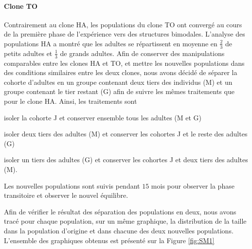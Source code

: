 \paragraph{Clone TO} Contrairement au clone HA, les populations du clone TO ont
convergé au cours de la première phase de l'expérience vers des structures
bimodales. L'analyse des populations HA a montré que les adultes se répartissent
en moyenne en $\frac{2}{3}$ de petits adultes et $\frac{1}{3}$ de grands
adultes. Afin de conserver des manipulations comparables entre les clones HA et
TO, et mettre les nouvelles populations dans des conditions similaires entre les
deux clones, nous avons décidé de séparer la cohorte d'adultes en un groupe
contenant deux tiers des individus (M) et un groupe contenant le tier restant
(G) afin de suivre les mêmes traitements que pour le clone HA.
Ainsi, les traitements sont \begin{enumerate*}[label=(\roman*), before=\unskip{ : }, itemjoin={{ ; }},
itemjoin*={{ ; et }}]
\item isoler la cohorte J et conserver ensemble tous les adultes (M et G)
\item isoler deux tiers des adultes (M) et conserver les cohortes J et le reste
des adultes (G)
\item isoler un tiers des adultes (G) et conserver les cohortes J et deux tiers
des adultes (M).
\end{enumerate*} 
Les nouvelles populations sont suivis pendant $15$ mois pour observer la phase
transitoire et observer le nouvel équilibre. 

Afin de vérifier le résultat des séparation des populations en deux, nous avons
tracé pour chaque population, sur un même graphique, la distribution de la
taille dans la population d'origine et dans chacune des deux nouvelles
populations. L'ensemble des graphiques obtenus est présenté sur la Figure
\ref{fig:SM1}

